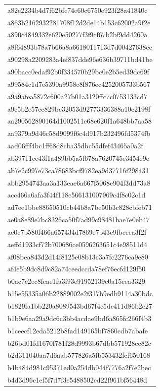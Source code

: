 \begin{tabular}{l}
a82e2234b4d7f62bfe74e60c6750e923f28a41840c \\
a863b2162932281708f12d2de14b153c62002a9f2e \\
a890c4849332e620e50277f3f9cf67b2bf9dd4260a \\
a8f64893b78a7b66a8a6618011713d7d00427638ce \\
a90298a2209283a4ef837dde96e636b39711bd41be \\
a90bacc0edaf92b0f334570b29bc0e2b5ed39dc69f \\
a99584c1d7e5390a9958c8f876ec4252005733b567 \\
a9a9afea5872c600a27b01a3120ffc7c0753133cd7 \\
a9c5b2e57ce829bc32053d92773336388a10e2198f \\
aa290562890164d1002511e68e620f1a648bb7aa58 \\
aa9379a9d46c58d9099f6c4d917b232496fd5374fb \\
aad06fff4bc1ff68d8cba35dbc55dfef43465a0a2f \\
ab39711ce43f1a489bb5a5f678a7620745e3454e9e \\
ab7e2c997e73ca78683bcf9782ea9d37716f298431 \\
abb2954743aa3a133eae6a667f5068c904f3dd73a8 \\
acc466a6afa3f44f118e566131007969c4f8c02c1d \\
ad7ee1bbe88650510cb44b8a7be50b3c828cbfeb71 \\
ae0a8e89e7bc8326ca50f7ad99c98481bae7e0eb47 \\
ae0c7b580f466a657434d7869e7b43c9fbecca3f2f \\
aeffd1933cf72b700686ce0596263651c4e98511d4 \\
af08bea843d2d14f8125e08b13c3a7fc2276ca9e80 \\
af4e5b9dc8d9c82a74ceedccda78ef76ecfd129f50 \\
b0ac7e2ec8feae1fa3f93e91952139c0a15cea3329 \\
b15e55335a06b22889002e2f317b9edb9114a30bdc \\
b1829fa1bb220a8089543bd67f4c5dc411d86b2e27 \\
b1b9e6aa29a9dc6c3bb4acdae9bd6a865fc266f4b3 \\
b1ceecf12eda5212b8fad149165bf7860cdb7abafe \\
b26bd01fd1670f781f28d9993b67dbb571928cc82c \\
b2d311040aa7d6aab577826a5fb553432fcf650168 \\
b4b484d981c95371ed0a254db044f7776a2f7e2bec \\
b4d3d96c1ef5f7d7f3e5488502ed22f961bf56448d \\

\end{tabular}
